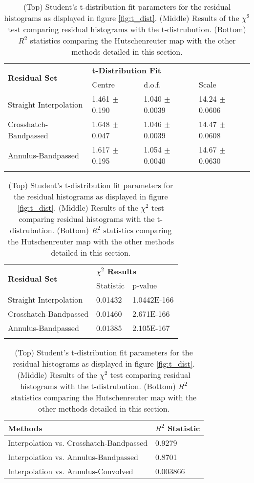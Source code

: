 \begin{table}
    \centering
    \begin{tabular}{l l l l}
        \hline
        \multirow{2}{*}{\bfseries{Residual Set}} & \multicolumn{3}{l}{\bfseries{t-Distribution Fit}} \\
        & Centre & d.o.f. & Scale \\
        \hline
        Straight Interpolation & 1.461 $\pm$ 0.190 & 1.040 $\pm$ 0.0039 & 14.24 $\pm$ 0.0606 \\
        Crosshatch-Bandpassed & 1.648 $\pm$ 0.047 & 1.046 $\pm$ 0.0039 & 14.47 $\pm$ 0.0608 \\
        Annulus-Bandpassed & 1.617 $\pm$ 0.195 & 1.054 $\pm$ 0.0040 & 14.67 $\pm$ 0.0630 \\
        \hline
        & & & \\
    \end{tabular}
    \begin{tabular}{l l l}
        \hline
        \multirow{2}{*}{\bfseries{Residual Set}} & \multicolumn{2}{l}{\bfseries{$\chi^2$ Results}} \\
        & Statistic & p-value \\
        \hline
        Straight Interpolation & 0.01432 & 1.0442E-166 \\
        Crosshatch-Bandpassed & 0.01460 & 2.671E-166 \\
        Annulus-Bandpassed & 0.01385 & 2.105E-167 \\
        \hline
        & & \\
    \end{tabular}
    \begin{tabular}{l l}
        \hline
        \bfseries{Methods} & \bfseries{$R^2$ Statistic} \\
        \hline
        Interpolation vs. Crosshatch-Bandpassed & 0.9279 \\
        Interpolation vs. Annulus-Bandpassed & 0.8701 \\
        Interpolation vs. Annulus-Convolved & 0.003866 \\
        \hline
    \end{tabular}
    \caption{(Top) Student's t-distribution fit parameters for the residual histograms as displayed in figure \ref{fig:t_dist}. (Middle) Results of the $\chi^2$ test comparing residual histograms with the t-distrubution. (Bottom) $R^2$ statistics comparing the Hutschenreuter map with the other methods detailed in this section.}
    \label{tab:fr_stats}
\end{table}

